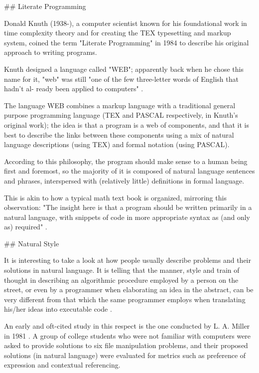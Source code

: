 ## Literate Programming

Donald Knuth (1938-), a computer scientist known for his foundational work in time complexity theory and for creating the TEX typesetting and markup system, coined the term "Literate Programming" in 1984 to describe his original approach to writing programs.

Knuth designed a language called "WEB"; apparently back when he chose this name for it, "web" was still "one of the few three-letter words of English that hadn't al-
ready been applied to computers" \cite{knuth1984literate}.

The language WEB combines a markup language with a traditional general purpose programming language (TEX and PASCAL respectively, in Knuth's original work); the idea is that a program is a web of components, and that it is best to describe the links between these components using a mix of natural language descriptions (using TEX) and formal notation (using PASCAL).

According to this philosophy, the program should make sense to a human being first and foremost, so the majority of it is composed of natural language sentences and phrases, interspersed with (relatively little) definitions in formal language. 

This is akin to how a typical math text book is organized, mirroring this observation: "The insight here is that a program should be written primarily in a natural language, with snippets of code in more appropriate syntax as (and only as) required" \cite{osmosianblog}.

## Natural Style

It is interesting to take a look at how people usually describe problems and their solutions in natural language. It is telling that the manner, style and train of thought in describing an algorithmic procedure employed by a person on the street, or even by a programmer when elaborating an idea in the abstract, can be very different from that which the same programmer employs when translating his/her ideas into executable code  \cite{knoll2006pegasus, miller1981natural}.

An early and oft-cited study in this respect is the one conducted by L. A. Miller in 1981 \cite{miller1981natural}. A group of college students who were not familiar with computers were asked to provide solutions to six file manipulation problems, and their proposed solutions (in natural language) were evaluated for metrics such as preference of expression and contextual referencing.

